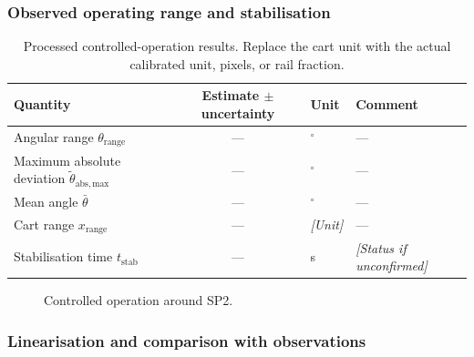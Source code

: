 \documentclass[11pt,a4paper]{article}
\newif\ifdraft
\DeclareRobustCommand{\guide}[1]{\ifdraft\par\smallskip\small\itshape Draft guidance: #1\par\smallskip\fi}
\newcommand{\manual}[1]{\cite[printed pp.~#1]{labmanual}}
\newcommand{\placeholder}[1]{\textit{[#1]}}
\newcommand{\figureplaceholder}[3]{%
  \begin{figure}[htbp]
    \centering
    \fbox{\parbox[c][38mm][c]{0.88\linewidth}{\centering
      \ifdraft #1\else Figure to be inserted\fi}}
    \caption{#2}\label{#3}
  \end{figure}}
\begin{document}
\subsubsection{Observed operating range and stabilisation}
\guide{Present the first cart-correction direction, angle extrema, cart extrema, remaining vibrations, angular range, maximum absolute angle deviation, cart-position range, mean angle, and stabilisation time. Sources: \manual{14--16}.}
\begin{table}[htbp]
\centering
\caption{Processed controlled-operation results. Replace the cart unit with the actual calibrated unit, pixels, or rail fraction.}
\label{tab:sp2results}
\begin{tabularx}{\linewidth}{@{}lclX@{}}
\toprule
Quantity & Estimate $\pm$ uncertainty & Unit & Comment \\
\midrule
Angular range $\theta_{\mathrm{range}}$ & --- & $^\circ$ & --- \\
Maximum absolute deviation $\tilde\theta_{\mathrm{abs,max}}$ & --- & $^\circ$ & --- \\
Mean angle $\bar\theta$ & --- & $^\circ$ & --- \\
Cart range $x_{\mathrm{range}}$ & --- & \placeholder{Unit} & --- \\
Stabilisation time $t_{\mathrm{stab}}$ & --- & s & \placeholder{Status if unconfirmed} \\
\bottomrule
\end{tabularx}
\end{table}
\figureplaceholder{Insert angle and cart position versus time in aligned panels. Mark control onset, the angular tolerance band, and the qualifying hold interval.}{Controlled operation around SP2.}{fig:sp2}

\subsubsection{Linearisation and comparison with observations}
\guide{Starting from Equation~\eqref{eq:nonlinear}, apply first-order Taylor expansions about $\hat\theta=0$, $\dot{\hat\theta}=0$, $\ddot{\hat\theta}=0$. Substitute operating-point plus deviation variables, remove equilibrium terms, and neglect products and powers of small deviations. Present the derived equation and explain the gravitational sign and cart-acceleration term. Assess validity using the measured angular deviations. Required derivation: \manual{15--16}. Keep $l$ symbolic unless a supported value is obtained; its numerical value is not in manual.}
\end{document}
